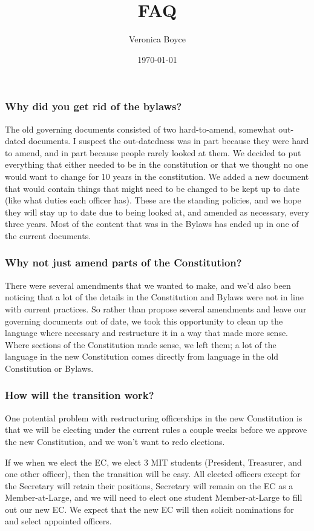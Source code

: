 \documentclass{article}
\title{FAQ}
\author{Veronica Boyce}
\date{\today}
\begin{document}
\maketitle

\subsubsection*{Why did you get rid of the bylaws?}
The old governing documents consisted of two hard-to-amend, somewhat out-dated documents. I suspect the out-datedness was in part because they were hard to amend, and in part because people rarely looked at them. We decided to put everything that either needed to be in the constitution or that we thought no one would want to change for 10 years in the constitution. We added a new document that would contain things that might need to be changed to be kept up to date (like what duties each officer has). These are the standing policies, and we hope they will stay up to date due to being looked at, and amended as necessary, every three years. Most of the content that was in the Bylaws has ended up in one of the current documents.

\subsubsection*{Why not just amend parts of the Constitution?}
There were several amendments that we wanted to make, and we'd also been noticing that a lot of the details in the Constitution and Bylaws were not in line with current practices. So rather than propose several amendments and leave our governing documents out of date, we took this opportunity to clean up the language where necessary and restructure it in a way that made more sense. Where sections of the Constitution made sense, we left them; a lot of the language in the new Constitution comes directly from language in the old Constitution or Bylaws.

\subsubsection*{How will the transition work?}
One potential problem with restructuring officerships in the new Constitution is that we will be electing under the current rules a couple weeks before we approve the new Constitution, and we won't want to redo elections.

If we when we elect the EC, we elect 3 MIT students (President, Treasurer, and one other officer), then the transition will be easy. All elected officers except for the Secretary will retain their positions, Secretary will remain on the EC as a Member-at-Large, and we will need to elect one student Member-at-Large to fill out our new EC. We expect that the new EC will then solicit nominations for and select appointed officers.
\end{document}
